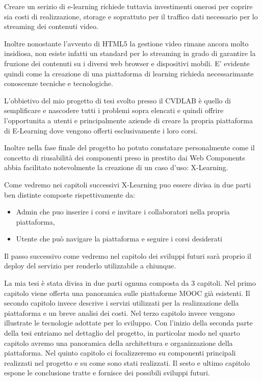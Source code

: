 Creare un serizio di e-learning richiede tuttavia investimenti onerosi per coprire sia costi di realizzazione, storage e soprattuto per il traffico dati necessario per lo streaming dei contenuti video.

Inoltre nonostante l'avvento di HTML5 la gestione video rimane ancora molto insidiosa, non esiste infatti un standard per lo streaming in grado di garantire la fruzione dei contenuti su i diversi web browser e dispositivi mobili.
E' evidente quindi come la creazione di una piattaforma di learning richieda necessarimante conoscenze tecniche e tecnologiche.


L'obbietivo del mio progetto di tesi svolto presso il CVDLAB è quello di semplificare e nascodere tutti i problemi sopra elencati e quindi offrire l'opportunita a utenti e principalmente aziende di creare la propria piattaforma di E-Learning dove vengono offerti esclusivamente i loro corsi.

Inoltre nella fase finale del progetto ho potuto constatare personalmente come il concetto di riusabilità dei componenti preso in prestito dai Web Components abbia facilitato notevolmente la creazione di un caso d'uso: X-Learning.

Come vedremo nei capitoli successivi X-Learning puo essere divisa in due parti ben distinte composte rispettivamente da:
\begin{itemize}
\item Admin che puo inserire i corsi e invitare i collaboratori nella propria piattaforma,
\item Utente che può navigare la piattaforma e seguire i corsi desiderati
\end{itemize}
Il passo successivo come vedremo nel capitolo dei sviluppi futuri sarà proprio il deploy del servizio per renderlo utilizzabile a chiunque.



La mia tesi è stata divisa in due parti ognuna composta da 3 capitoli.
Nel primo capitolo viene offerta una panoramica sulle piattaforme MOOC già esistenti.
Il secondo capitolo invece descrive i servizi utilizzati per la realizzazione della piattaforma e un breve analisi dei costi.
Nel terzo capitolo invece vengono illustrate le tecnologie adottate per lo sviluppo.
Con l'inizio della seconda parte della tesi entriamo nel dettaglio del progetto, in particolar modo nel quarto capitolo avremo una panoramica della architettura e organizzazione della piattaforma.
Nel quinto capitolo ci focalizzeremo su componenti principali realizzati nel progetto e su come sono stati realizzati.
Il sesto e ultimo capitolo espone le conclusione tratte e fornisce dei possibili sviluppi futuri.
